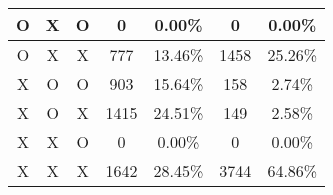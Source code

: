 \begin{table}[h!]
\begin{tabular}{|ccc|cc|cc|}
    O                                                        & X                                                       & O                               & 0                                                                                        & 0.00\%                                                         & 0                                                                                        & 0.00\%                                                         \\ \hline
    O                                                        & X                                                       & X                               & 777                                                                                      & 13.46\%                                                        & 1458                                                                                     & 25.26\%                                                        \\ \hline
    X                                                        & O                                                       & O                               & 903                                                                                      & 15.64\%                                                        & 158                                                                                      & 2.74\%                                                         \\ \hline
    X                                                        & O                                                       & X                               & 1415                                                                                     & 24.51\%                                                        & 149                                                                                      & 2.58\%                                                         \\ \hline
    X                                                        & X                                                       & O                               & 0                                                                                        & 0.00\%                                                         & 0                                                                                        & 0.00\%                                                         \\ \hline
    X                                                        & X                                                       & X                               & 1642                                                                                     & 28.45\%                                                        & 3744                                                                                     & 64.86\%                                                        \\ \hline

\end{tabular}
\end{table}
